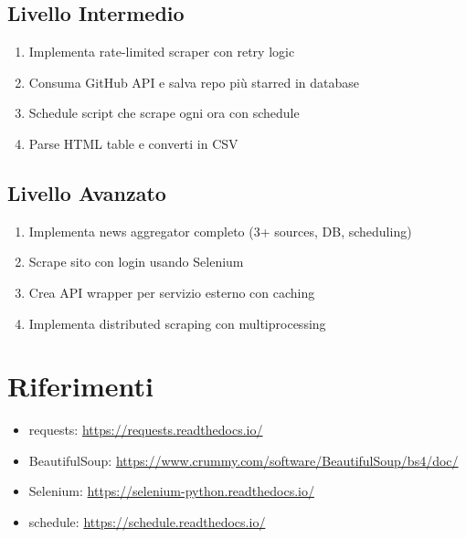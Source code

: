 \subsection{Livello Intermedio}
\begin{enumerate}
  \item Implementa rate-limited scraper con retry logic
  \item Consuma GitHub API e salva repo più starred in database
  \item Schedule script che scrape ogni ora con schedule
  \item Parse HTML table e converti in CSV
\end{enumerate}

\subsection{Livello Avanzato}
\begin{enumerate}
  \item Implementa news aggregator completo (3+ sources, DB, scheduling)
  \item Scrape sito con login usando Selenium
  \item Crea API wrapper per servizio esterno con caching
  \item Implementa distributed scraping con multiprocessing
\end{enumerate}

\section{Riferimenti}
\begin{itemize}
  \item requests: \url{https://requests.readthedocs.io/}
  \item BeautifulSoup: \url{https://www.crummy.com/software/BeautifulSoup/bs4/doc/}
  \item Selenium: \url{https://selenium-python.readthedocs.io/}
  \item schedule: \url{https://schedule.readthedocs.io/}
\end{itemize}
